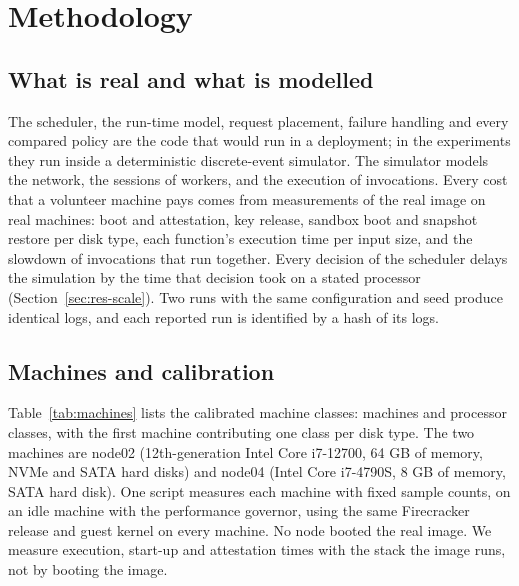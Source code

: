 \section{Methodology}
\label{sec:method}

\subsection{What is real and what is modelled}
\label{sec:real}

The scheduler, the run-time model, request placement, failure handling and every compared policy are the code that
would run in a deployment; in the experiments they run inside a deterministic discrete-event simulator. The simulator
models the network, the sessions of workers, and the execution of invocations. Every cost that a volunteer machine
pays comes from measurements of the real image on real machines: boot and attestation, key release, sandbox boot and
snapshot restore per disk type, each function's execution time per input size, and the slowdown of invocations that
run together. Every decision of the scheduler delays the simulation by the time that decision took on a stated
processor (Section~\ref{sec:res-scale}). Two runs with the same configuration and seed produce identical logs, and
each reported run is identified by a hash of its logs.

\subsection{Machines and calibration}
\label{sec:calib}

Table~\ref{tab:machines} lists the calibrated machine classes: \VMachCount{} machines and \VMachProcClasses{}
processor classes, with the first machine contributing one class per disk type. The two machines are node02
(12th-generation Intel Core i7-12700, 64 GB of memory, NVMe and SATA hard disks) and node04 (Intel Core i7-4790S,
8 GB of memory, SATA hard disk). One script measures each machine with fixed sample counts, on an idle machine with
the performance governor, using the same Firecracker release and guest kernel on every machine. No node booted the
real image. We measure execution, start-up and attestation times with the stack the image runs, not by booting the
image.

